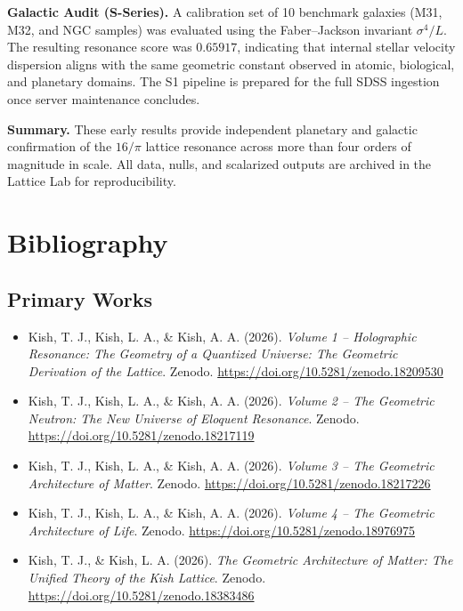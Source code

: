 \documentclass[11pt, letterpaper, openany]{book}
\begin{document}
\medskip
\noindent\textbf{Galactic Audit (S-Series).}
A calibration set of 10 benchmark galaxies (M31, M32, and NGC samples) was evaluated using the Faber–Jackson invariant $\sigma^{4}/L$. The resulting resonance score was $0.65917$, indicating that internal stellar velocity dispersion aligns with the same geometric constant observed in atomic, biological, and planetary domains. The S1 pipeline is prepared for the full SDSS ingestion once server maintenance concludes.

\medskip
\noindent\textbf{Summary.}
These early results provide independent planetary and galactic confirmation of the $16/\pi$ lattice resonance across more than four orders of magnitude in scale. All data, nulls, and scalarized outputs are archived in the Lattice Lab for reproducibility.

\chapter*{Bibliography}
\section*{Primary Works}
\begin{itemize}
    \item Kish, T. J., Kish, L. A., \& Kish, A. A. (2026). \textit{Volume 1 -- Holographic Resonance: The Geometry of a Quantized Universe: The Geometric Derivation of the Lattice}. Zenodo. \url{https://doi.org/10.5281/zenodo.18209530}

    \item Kish, T. J., Kish, L. A., \& Kish, A. A. (2026). \textit{Volume 2 -- The Geometric Neutron: The New Universe of Eloquent Resonance}. Zenodo. \url{https://doi.org/10.5281/zenodo.18217119}

    \item Kish, T. J., Kish, L. A., \& Kish, A. A. (2026). \textit{Volume 3 -- The Geometric Architecture of Matter}. Zenodo. \url{https://doi.org/10.5281/zenodo.18217226}
	
	\item Kish, T. J., Kish, L. A., \& Kish, A. A. (2026). \textit{Volume 4 -- The Geometric Architecture of Life}. Zenodo. \url{https://doi.org/10.5281/zenodo.18976975}

    \item Kish, T. J., \& Kish, L. A. (2026). \textit{The Geometric Architecture of Matter: The Unified Theory of the Kish Lattice}. Zenodo. \url{https://doi.org/10.5281/zenodo.18383486}
\end{itemize}
\end{document}
